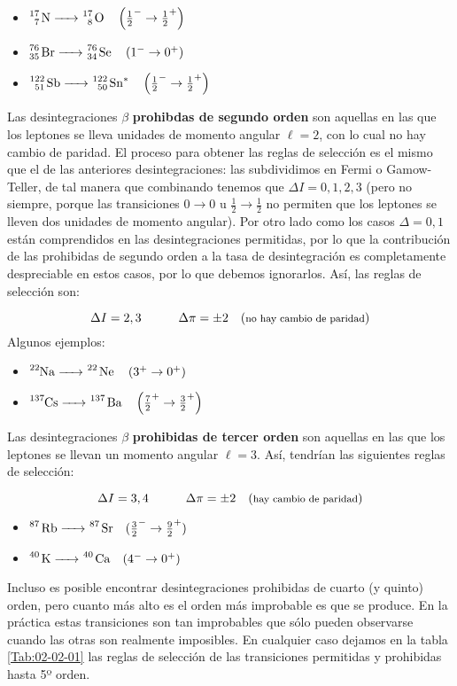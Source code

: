 \begin{itemize}
	\item $\ce{^17_7 N -> ^17_8 O} \quad \parentesis{\frac{1}{2}^- \rightarrow \frac{1}{2}^+}$
	\item $\ce{^76_35 Br -> ^76_34 Se}  \quad \parentesis{1^- \rightarrow 0^+}$
	\item $\ce{^122_51 Sb -> ^122_50 Sn^*}  \quad \parentesis{\frac{1}{2}^- \rightarrow \frac{1}{2}^+}$
\end{itemize}
Las desintegraciones $\beta$ \textbf{prohibdas de segundo orden} son aquellas en las que los leptones se lleva unidades de momento angular $\ell=2$, con lo cual no hay cambio de paridad. El proceso para obtener las reglas de selección es el mismo que el de las anteriores desintegraciones: las subdividimos en Fermi o Gamow-Teller, de tal manera que combinando tenemos que $\Delta I = 0,1,2,3$ (pero no siempre, porque las transiciones $0\rightarrow 0$ u $\frac{1}{2} \rightarrow \frac{1}{2}$ no permiten que los leptones se lleven dos unidades de momento angular). Por otro lado como los casos $\Delta = 0,1$ están comprendidos en las desintegraciones permitidas, por lo que la contribución de las prohibidas de segundo orden a la tasa de desintegración es completamente despreciable en estos casos, por lo que debemos ignorarlos. Así, las reglas de selección son:

\begin{equation}
	\Delta I = 2,3 \quad \quad \quad \Delta \pi = \pm 2\quad (\text{{\footnotesize no hay cambio de paridad}})
\end{equation}
Algunos ejemplos:

\begin{itemize}
	\item $\ce{^22Na ->^22 Ne} \quad \parentesis{3^+ \rightarrow 0^+}$  
	\item $\ce{^137Cs ->^137 Ba} \quad \parentesis{\frac{7}{2}^+ \rightarrow \frac{3}{2}^+}$  
\end{itemize}

Las desintegraciones $\beta$ \textbf{prohibidas de tercer orden} son aquellas en las que los leptones se llevan un momento angular $\ell=3$. Así, tendrían las siguientes reglas de selección:

\begin{equation}
	\Delta I = 3,4 \quad \quad \quad \Delta \pi = \pm 2\quad (\text{{\footnotesize  hay cambio de paridad}})
\end{equation}

\begin{itemize}
	\item $\ce{^87 Rb -> ^87 Sr} \quad (\frac{3}{2}^- \rightarrow \frac{9}{2}^+)$
	\item $\ce{^40 K -> ^40 Ca} \quad (4^- \rightarrow 0^+)$
\end{itemize}
Incluso es posible encontrar desintegraciones prohibidas de cuarto (y quinto) orden, pero cuanto más alto es el orden más improbable es que se produce. En la práctica estas transiciones son tan improbables que sólo pueden observarse cuando las otras son realmente imposibles. En cualquier caso dejamos en la tabla \ref{Tab:02-02-01} las reglas de selección de las transiciones permitidas y prohibidas hasta 5º orden.

